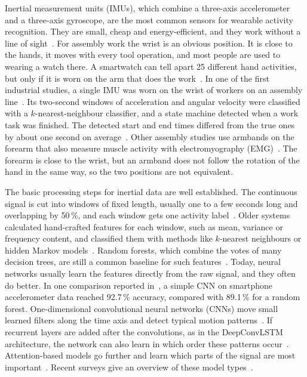 Inertial measurement units (IMUs), which combine a three-axis accelerometer and
a three-axis gyroscope, are the most common sensors for wearable activity
recognition. They are small, cheap and energy-efficient, and they work without
a line of sight~\cite{bulling2014tutorial, kumar2024har}. For assembly work
the wrist is an obvious position. It is close to the hands, it moves with every
tool operation, and most people are used to wearing a watch there. A smartwatch
can tell apart 25 different hand activities, but only if it is worn on the arm
that does the work~\cite{laput2019sensing}. In one of the first industrial
studies, a single IMU was worn on the wrist of workers on an assembly
line~\cite{koskimaki2009activity}. Its two-second windows of acceleration and
angular velocity were classified with a $k$-nearest-neighbour classifier, and a
state machine detected when a work task was finished. The detected start and
end times differed from the true ones by about one
second on average~\cite{koskimaki2009activity}. Other assembly studies use
armbands on the forearm that also measure muscle activity with
electromyography (EMG)~\cite{tao2018worker, alamin2019action}. The forearm is
close to the wrist, but an armband does not follow the rotation of the hand in
the same way, so the two positions are not equivalent.

The basic processing steps for inertial data are well established. The
continuous signal is cut into windows of fixed length, usually one to a few
seconds long and overlapping by 50\,\%, and each window gets one activity
label~\cite{bulling2014tutorial, banos2014window}. Older systems calculated
hand-crafted features for each window, such as mean, variance or frequency
content, and classified them with methods like $k$-nearest neighbours or hidden
Markov models~\cite{koskimaki2009activity, ward2006activity}. Random forests,
which combine the votes of many decision trees, are still a common baseline for
such features~\cite{chatterjee2020laso, koch2024recognition}. Today, neural
networks usually learn the features directly from the raw signal, and they often
do better. In one comparison reported in~\cite{koch2024recognition}, a simple
CNN on smartphone accelerometer data reached 92.7\,\% accuracy, compared with
89.1\,\% for a random forest.
One-dimensional convolutional neural networks (CNNs) move small learned filters
along the time axis and detect typical motion patterns~\cite{tao2018worker,
alamin2019action}. If recurrent layers are added after the convolutions, as in
the DeepConvLSTM architecture, the network can also learn in which order these
patterns occur~\cite{ordonez2016deep, zhou2025efficient}. Attention-based models go further and learn which parts of the signal
are most important~\cite{gao2023mmtsa}. Recent surveys give an overview of
these model types~\cite{kumar2024har}.

